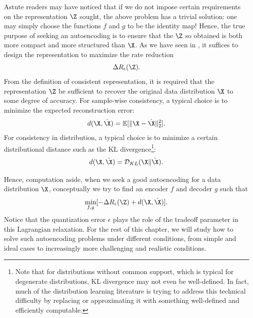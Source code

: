 \documentclass[../../book-main.tex]{subfiles}
\begin{document}
Astute readers may have noticed that if we do not impose certain
requirements on the representation $\Z$ sought, the above problem has
a trivial solution: one may simply choose the functions $f$ and $g$
to be the identity map! Hence, the true purpose of seeking an
autoencoding is to ensure that the $\Z$ so obtained is both more
compact and more structured than $\X$.
As we have seen in ,
it suffices to design the representation to maximize the rate reduction
\begin{equation}
  \Delta R_{\epsilon}(\Z).
\end{equation}%
From the definition of consistent representation, it is required that
the representation $\Z$ be sufficient to recover the original data
distribution $\X$ to some degree of accuracy. For sample-wise
consistency, a typical choice is to minimize the expected reconstruction error:
\begin{equation}
  d(\X, \hat \X) = \mathbb{E}[\|\X - \hat\X\|_2^2].
\end{equation}
For consistency in distribution, a typical choice is to minimize a
certain distributional distance such as the KL
divergence\footnote{Note that for distributions without common
  support, which is typical for degenerate distributions, KL divergence
  may not even be well-defined. In fact, much of the distribution
  learning literature is trying to address this technical difficulty by
  replacing or approximating it with something well-defined and
efficiently computable.}:
\begin{equation}
  d(\X, \hat \X) = \mathcal{D}_{KL}(\X\|\hat\X).
\end{equation}

Hence, computation aside, when we seek a good autoencoding for a data
distribution $\X$, conceptually we try to find an encoder $f$ and
decoder $g$ such that
\begin{equation}
  \min_{f, g} [- \Delta R_{\epsilon}(\Z) + d(\X, \hat \X)].
  \label{eqn:autoencode-objective-ch5}
\end{equation}
Notice that the quantization error $\epsilon$ plays the role of the tradeoff
parameter in this Lagrangian relaxation.
For the rest of this chapter, we will study how to solve such
autoencoding problems under different conditions, from simple and
ideal cases to increasingly more challenging and realistic conditions.
\end{document}
